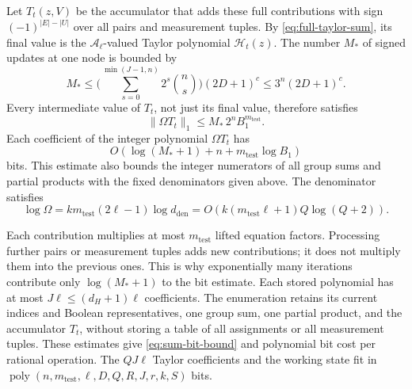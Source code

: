 \documentclass[11pt,reqno]{amsart}
\numberwithin{equation}{section}
\theoremstyle{definition}\newtheorem{definition}[theorem]{Definition}
\theoremstyle{remark}\newtheorem{remark}[theorem]{Remark}
\newcommand{\poly}{\operatorname{poly}}
\renewcommand{\le}{\leqslant}
\begin{document}
Let $T_t(z,V)$ be the accumulator that adds these full
contributions with sign $(-1)^{|E|-|U|}$ over all pairs and measurement
tuples. By \eqref{eq:full-taylor-sum}, its final value is the
$\mathcal A_\ell$-valued Taylor polynomial $\mathcal H_t(z)$.
The number $M_*$ of signed updates at one node is bounded by
\[
 M_*\le
 \biggl(\sum_{s=0}^{\min(J-1,n)}2^s\binom ns\biggr)(2D+1)^c
 \le3^n(2D+1)^c.
\]
Every intermediate value of $T_t$, not just its final value,
therefore satisfies
\[
 \|\Omega T_t\|_1
 \le M_*\,2^nB_1^{m_{\mathrm{test}}}.
\]
Each coefficient of the integer polynomial $\Omega T_t$ has
\[
 O\!\left(\log(M_*+1)+n+m_{\mathrm{test}}\log B_1\right)
\]
bits. This estimate also bounds the integer numerators of all group
sums and partial products with the fixed denominators given above.
The denominator satisfies
\[
 \log\Omega
 =k m_{\mathrm{test}}(2\ell-1)\log d_{\mathrm{den}}
 =O\!\left(k(m_{\mathrm{test}}\ell+1)Q\log(Q+2)\right).
\]

Each contribution multiplies at most $m_{\mathrm{test}}$ lifted equation factors. Processing further pairs or measurement tuples adds
new contributions; it does not multiply them into the previous ones.
This is why exponentially many iterations contribute only
$\log(M_*+1)$ to the bit estimate. Each stored polynomial has at most
$J\ell\le(d_H+1)\ell$ coefficients. The enumeration retains its current
indices and Boolean representatives, one group sum, one partial
product, and the accumulator $T_t$, without storing a table of
all assignments or all measurement tuples. These estimates give
\eqref{eq:sum-bit-bound} and polynomial bit cost per rational operation.
The $QJ\ell$ Taylor coefficients and the working state fit in
$\poly(n,m_{\mathrm{test}},\ell,D,Q,R,J,r,k,S)$ bits.
\end{document}
